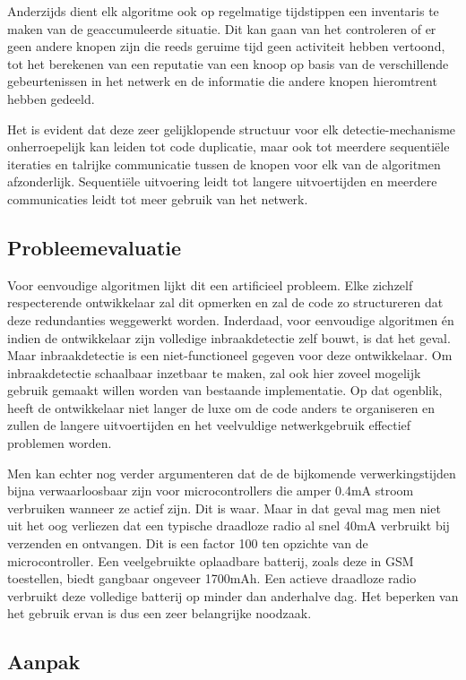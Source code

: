 \documentclass[12pt,a4paper]{article}
\begin{document}
Anderzijds dient elk algoritme ook op regelmatige tijdstippen een inventaris te
maken van de geaccumuleerde situatie. Dit kan gaan van het controleren of er
geen andere knopen zijn die reeds geruime tijd geen activiteit hebben vertoond,
tot het berekenen van een reputatie van een knoop op basis van de verschillende
gebeurtenissen in het netwerk en de informatie die andere knopen hieromtrent
hebben gedeeld.

Het is evident dat deze zeer gelijklopende structuur voor elk
detectie-mechanisme onherroepelijk kan leiden tot code duplicatie, maar ook tot
meerdere sequenti\"ele iteraties en talrijke communicatie tussen de knopen voor
elk van de algoritmen afzonderlijk. Sequenti\"ele uitvoering leidt tot langere
uitvoertijden en meerdere communicaties leidt tot meer gebruik van het netwerk.

\subsection*{Probleemevaluatie}

Voor eenvoudige algoritmen lijkt dit een artificieel probleem. Elke zichzelf
respecterende ontwikkelaar zal dit opmerken en zal de code zo structureren dat
deze redundanties weggewerkt worden. Inderdaad, voor eenvoudige algoritmen \'en
indien de ontwikkelaar zijn volledige inbraakdetectie zelf bouwt, is dat het
geval. Maar inbraakdetectie is een niet-functioneel gegeven voor deze
ontwikkelaar. Om inbraakdetectie schaalbaar inzetbaar te maken, zal ook hier
zoveel mogelijk gebruik gemaakt willen worden van bestaande implementatie. Op
dat ogenblik, heeft de ontwikkelaar niet langer de luxe om de code anders te
organiseren en zullen de langere uitvoertijden en het veelvuldige
netwerkgebruik effectief problemen worden.

Men kan echter nog verder argumenteren dat de de bijkomende verwerkingstijden
bijna verwaarloosbaar zijn voor microcontrollers die amper 0.4mA stroom
verbruiken wanneer ze actief zijn. Dit is waar. Maar in dat geval mag men niet
uit het oog verliezen dat een typische draadloze radio al snel 40mA verbruikt
bij verzenden en ontvangen. Dit is een factor 100 ten opzichte van de
microcontroller. Een veelgebruikte oplaadbare batterij, zoals deze in GSM
toestellen, biedt gangbaar ongeveer 1700mAh. Een actieve draadloze radio
verbruikt deze volledige batterij op minder dan anderhalve dag. Het beperken
van het gebruik ervan is dus een zeer belangrijke noodzaak.

\subsection*{Aanpak}
\end{document}
